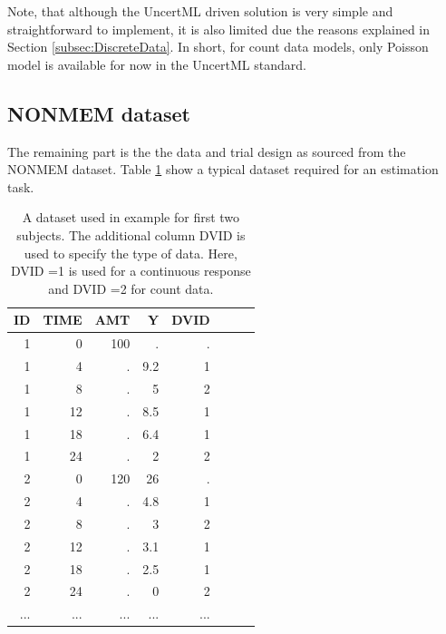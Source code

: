 Note, that although the UncertML driven solution is very simple and straightforward
to implement, it is also limited due the reasons explained in Section 
\ref{subsec:DiscreteData}. In short, for count data models, only Poisson model is 
available for now in the  UncertML standard.


\subsection{NONMEM dataset}
\label{sec:eg6-NONMEMdataset}
The remaining part is the the data and trial design as sourced from the 
NONMEM dataset. Table \ref{tab:example6_dataSet} show a typical dataset required for 
an estimation task.
\begin{table}[htdp]
\begin{center}
\small
\begin{tabular}{rrrrrrrr}\toprule
ID 	& TIME	& AMT	& Y		& DVID \\ \midrule
1 	& 0 		& 100 	& . 		& . \\ 
1 	& 4 		& . 		& 9.2 	& 1 \\ 
1 	& 8 		& . 		& 5 		& 2 \\ 
1 	& 12 	& . 		& 8.5 	& 1 \\ 
1 	& 18 	& . 		& 6.4 	& 1 \\ 
1 	& 24 	& . 		& 2 		& 2 \\ 
2 	& 0 		& 120	&  26 	& . \\ 
2 	& 4 		& . 		& 4.8 	& 1 \\ 
2 	& 8 		& . 		& 3 		& 2 \\ 
2 	& 12 	& . 		& 3.1 	& 1 \\ 
2 	& 18 	& . 		& 2.5 	& 1 \\ 
2 	& 24 	& . 		& 0 		& 2 \\ 
...	& ...		& ...		& ...		& ...	\\ \bottomrule
\end{tabular}
\end{center}
\caption{A dataset used in example for first two subjects.
The additional column DVID is used to specify the type of data. Here, 
DVID =1 is used for a continuous response and DVID =2 for count data.}
\label{tab:example6_dataSet}
\end{table}%




